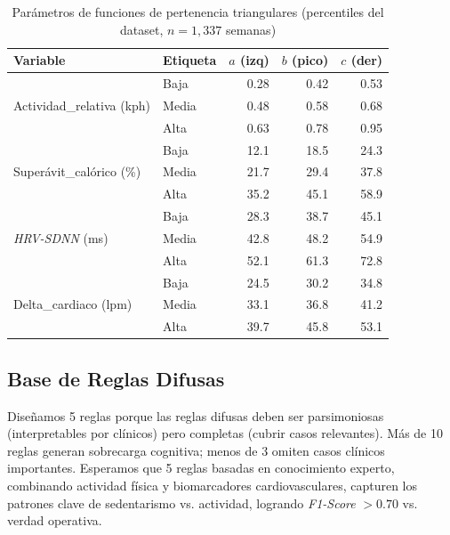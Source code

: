 \begin{table}[H]
    \centering
    \caption{Parámetros de funciones de pertenencia triangulares (percentiles del dataset, $n=1,337$ semanas)}
    \label{tab:mf_params}
    \scriptsize
    \begin{tabular}{@{}llrrr@{}}
        \toprule
        \textbf{Variable} & \textbf{Etiqueta} & \textbf{$a$ (izq)} & \textbf{$b$ (pico)} & \textbf{$c$ (der)} \\
        \midrule
        \multirow{3}{*}{Actividad\_relativa (kph)} 
            & Baja  & 0.28 & 0.42 & 0.53 \\
            & Media & 0.48 & 0.58 & 0.68 \\
            & Alta  & 0.63 & 0.78 & 0.95 \\
        \midrule
        \multirow{3}{*}{Superávit\_calórico (\%)} 
            & Baja  & 12.1 & 18.5 & 24.3 \\
            & Media & 21.7 & 29.4 & 37.8 \\
            & Alta  & 35.2 & 45.1 & 58.9 \\
        \midrule
        \multirow{3}{*}{\textit{HRV-SDNN} (ms)} 
            & Baja  & 28.3 & 38.7 & 45.1 \\
            & Media & 42.8 & 48.2 & 54.9 \\
            & Alta  & 52.1 & 61.3 & 72.8 \\
        \midrule
        \multirow{3}{*}{Delta\_cardiaco (lpm)} 
            & Baja  & 24.5 & 30.2 & 34.8 \\
            & Media & 33.1 & 36.8 & 41.2 \\
            & Alta  & 39.7 & 45.8 & 53.1 \\
        \bottomrule
    \end{tabular}
\end{table}

\FloatBarrier

\subsection{Base de Reglas Difusas}

Diseñamos 5 reglas porque las reglas difusas deben ser parsimoniosas (interpretables por clínicos) pero completas (cubrir casos relevantes). Más de 10 reglas generan sobrecarga cognitiva; menos de 3 omiten casos clínicos importantes. Esperamos que 5 reglas basadas en conocimiento experto, combinando actividad física y biomarcadores cardiovasculares, capturen los patrones clave de sedentarismo vs. actividad, logrando \textit{F1-Score} $> 0.70$ vs. verdad operativa.

